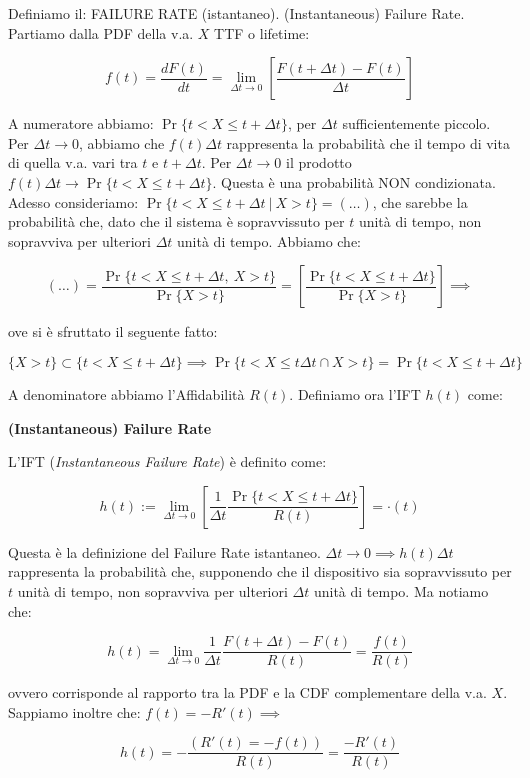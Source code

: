 Definiamo il: FAILURE RATE (istantaneo). (Instantaneous) Failure Rate. Partiamo dalla PDF della v.a. $X$ TTF o lifetime:

\[
	f(t) = \frac{d F(t)}{dt} = \lim_{\Delta t\to 0}{[\frac{F(t+\Delta t)-F(t)}{\Delta t}]}
\]

A numeratore abbiamo: $\Pr\{t < X \leq t+\Delta t\}$, per $\Delta t$ sufficientemente piccolo. Per $\Delta t\to 0$, abbiamo che $f(t)\Delta t$ rappresenta la probabilità che il tempo di vita di quella v.a. vari tra $t$ e $t+\Delta t$. Per $\Delta t\to 0$ il prodotto $f(t)\Delta t \to \Pr\{t < X \leq t+\Delta t\}$. Questa è una probabilità NON condizionata. Adesso consideriamo: $\Pr\{t < X \leq t+\Delta t\ |\ X > t\} = (\dots)$, che sarebbe la probabilità che, dato che il sistema è sopravvissuto per $t$ unità di tempo, non sopravviva per ulteriori $\Delta t$ unità di tempo. Abbiamo che:

\[
	(\dots) = \frac{\Pr\{t < X \leq t+\Delta t,\ X > t\}}{\Pr\{X > t\}} = [\frac{\Pr\{t < X \leq t+\Delta t\}}{\Pr\{X > t\}}] \implies
\]

ove si è sfruttato il seguente fatto:

\[
	\{X > t\} \subset \{t < X \leq t+\Delta t\} \implies \Pr\{t < X \leq t\Delta t \cap X > t\} = \Pr\{t < X \leq t+\Delta t\}
\]

A denominatore abbiamo l'Affidabilità $R(t)$. Definiamo ora l'IFT $h(t)$ come:

\begin{defn}{\textbf{(Instantaneous) Failure Rate}}

L'IFT (\textit{Instantaneous Failure Rate}) è definito come:

\[
	h(t) := \lim_{\Delta t \to 0}{[\frac{1}{\Delta t} \frac{\Pr\{t < X \leq t+\Delta t\}}{R(t)}]} = \mathord{\cdot}(t)
\]

\end{defn}

Questa è la definizione del Failure Rate istantaneo. $\Delta t\to 0 \implies h(t)\Delta t$ rappresenta la probabilità che, supponendo che il dispositivo sia sopravvissuto per $t$ unità di tempo, non sopravviva per ulteriori $\Delta t$ unità di tempo. Ma notiamo che:

\[
	h(t) = \lim_{\Delta t\to 0}{\frac{1}{\Delta t} \frac{F(t+\Delta t)-F(t)}{R(t)}} = \frac{f(t)}{R(t)}
\]

ovvero corrisponde al rapporto tra la PDF e la CDF complementare della v.a. $X$. Sappiamo inoltre che: $f(t)=-R'(t) \implies$

\[	
	h(t) = -\frac{(R'(t) = -f(t))}{R(t)} = \frac{-R'(t)}{R(t)}
\]

